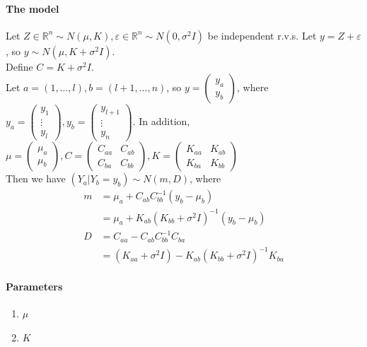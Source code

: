 \documentclass[11pt]{article}
\newcommand{\real}[0]{\mathbb{R}}
\begin{document}
\paragraph{The model}
Let $Z \in \real^n \sim N(\mu, K), \varepsilon \in \real^n \sim N(0, \sigma^2I)$ be independent r.v.s. Let $y = Z + \varepsilon$, so $y \sim N(\mu, K+\sigma^2I)$.\\
Define $C = K + \sigma^2 I$.\\
Let $a = (1, \hdots, l), b = (l+1, \hdots, n)$, so $y = \begin{pmatrix}
	y_a \\ y_b \end{pmatrix}$, where $y_a = \begin{pmatrix} y_1 \\ \vdots \\y_l
	\end{pmatrix}, y_b = \begin{pmatrix} y_{l+1} \\ \vdots \\ y_n \end{pmatrix}$.
	In addition, $\mu = \begin{pmatrix} \mu_a \\ \mu_b \end{pmatrix}, C = \begin{pmatrix} C_{aa} & C_{ab} \\ C_{ba} & C_{bb} \end{pmatrix}, K = \begin{pmatrix} K_{aa} & K_{ab} \\ K_{ba} & K_{bb} \end{pmatrix}$\\
Then we have $(Y_a | Y_b = y_b) \sim N(m, D)$, where 
\begin{align*}
	m &= \mu_a + C_{ab}C^{-1}_{bb}(y_b - \mu_b) \\
	&= \mu_a +K_{ab}(K_{bb} + \sigma^2 I)^{-1}(y_b - \mu_b)\\
	D &= C_{aa} - C_{ab}C^{-1}_{bb}C_{ba} \\
	&= (K_{aa}+\sigma^2 I)-K_{ab}(K_{bb}+\sigma^2I)^{-1}K_{ba}
\end{align*}
\paragraph{Parameters}
\begin{enumerate}
	\item $\mu$
	\item $K$
\end{enumerate}
\end{document}
